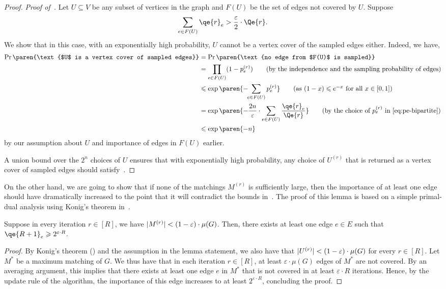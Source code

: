 \documentclass{article}
\renewcommand{\leq}{\leqslant}
\renewcommand{\geq}{\geqslant}
\DeclarePairedDelimiter{\paren}()
\DeclarePairedDelimiter{\card}{\vert}{\vert}
\newcommand{\eps}{\varepsilon}
\begin{document}
\begin{proof}
	\noindent
	\emph{Proof of~.} Let $U \subseteq V$ be any subset of vertices in the graph and $F(U)$ be the set of edges not covered by $U$. 
	Suppose 
	\[
		\sum_{e \in F(U)} \qe{r}_e > \frac{\eps}{2} \cdot \Qe{r}.
	\]
	We show that in this case, with an exponentially high probability, $U$ cannot be a vertex cover of the sampled edges either. Indeed, we have, 
	\begin{align*}
		\Pr\paren{\text{$U$ is a vertex cover of sampled edges}} &= \Pr\paren{\text{no edge from $F(U)$ is sampled}} \\
		&= \prod_{e \in F(U)} (1-p^{(r)}_e) \tag{by the independence and the sampling probability of edges} \\
		&\leq \exp\paren{-\!\!\sum_{e \in F(U)} p^{(r)}_e} \tag{as $(1-x) \leq e^{-x}$ for all $x \in [0,1]$} \\
		&= \exp\paren{-\frac{2n}{\eps} \cdot \sum_{e \in F(U)} \frac{\qe{r}_e}{\Qe{r}}} \tag{by the choice of $p^{(r)}_e$ in~\Cref{eq:pe-bipartite}} \\
		&\leq \exp\paren{-n}
	\end{align*}
	by our assumption about $U$ and importance of edges in $F(U)$ earlier. 
	
	A union bound over the $2^{n}$ choices of $U$ ensures that with exponentially high probability, any choice of  $U^{(r)}$ that is returned as a vertex cover 
	of sampled edges should satisfy~. 
\end{proof}
	
On the other hand, we are going to show that if none of the matchings $M^{(r)}$ is sufficiently large, then the importance of at least one edge should have dramatically increased to the point that it will contradict the bounds in~. 
The proof of this lemma is based on a simple primal-dual analysis using Konig's theorem in~. 

\begin{lemma}\label{lem:Qe-large-bipartite}
	Suppose in every iteration $r \in [R]$, we have $\card{M^{(r)}} < (1-\eps) \cdot \mu(G)$. Then, 
	there exists at least one edge $e \in E$ such that $\qe{R+1}_e \geq 2^{\eps \cdot R}$.  
\end{lemma}
\begin{proof}
	By Konig's theorem () and the assumption in the lemma statement,  we also have that $\card{U^{(r)}} < (1-\eps) \cdot \mu(G)$ for every $r \in [R]$. Let $M^*$ be a maximum matching of $G$. 
	We thus have that in each iteration $r \in [R]$, at least $\eps \cdot \mu(G)$ edges of $M^*$ are not covered. By an averaging argument, this implies that there exists at least one edge $e$ in $M^*$ that is not
	covered in at least $\eps \cdot R$ iterations. Hence, by the update rule of the algorithm, the importance of this edge increases to at least $2^{\eps \cdot R}$, concluding the proof. 
\end{proof}
\end{document}
